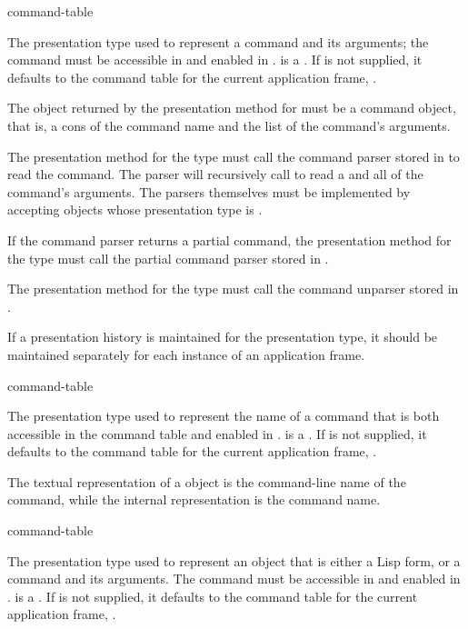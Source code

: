  {\key command-table}

The presentation type used to represent a command and its arguments; the command
must be accessible in  and enabled in
.   is a .  If  is not supplied, it defaults to the command
table for the current application frame, .

The object returned by the  presentation method for 
must be a command object, that is, a cons of the command name and the list of
the command's arguments.

The  presentation method for the  type must call the
command parser stored in  to read the command.  The parser
will recursively call  to read a  and all of the
command's arguments.  The parsers themselves must be implemented by accepting
objects whose presentation type is .

If the command parser returns a partial command, the  presentation
method for the  type must call the partial command parser stored in
.

The  presentation method for the  type must call the
command unparser stored in .

If a presentation history is maintained for the  presentation type,
it should be maintained separately for each instance of an application frame.

 {\key command-table}

The presentation type used to represent the name of a command that is both
accessible in the command table  and enabled in
.   is a .  If  is not supplied, it defaults to the command
table for the current application frame, .

The textual representation of a  object is the command-line
name of the command, while the internal representation is the command name.

 {\key command-table}

The presentation type used to represent an object that is either a Lisp form, or
a command and its arguments.  The command must be accessible in
 and enabled in .  
is a .  If  is not supplied, it
defaults to the command table for the current application frame,
.

